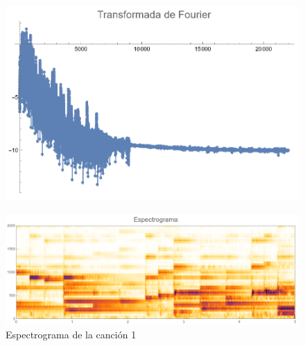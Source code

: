 \documentclass[12pt, letterpaper]{article}
\begin{document}
\begin{figure}[H]
  \centering
  \begin{minipage}{.4\linewidth}
    \centering
    \includegraphics[width=\linewidth]{imgs/Cancion1/transformada.png}
    \label{fig:01a}
  \end{minipage}
  \begin{minipage}{0.07\textwidth}\end{minipage}
  \begin{minipage}{.47\linewidth}
    \centering
    \includegraphics[width=\linewidth]{imgs/Cancion1/espectrograma.png}
    \caption{Espectrograma de la canción 1}
    \label{fig:01i}
  \end{minipage}
\end{figure}
\end{document}
